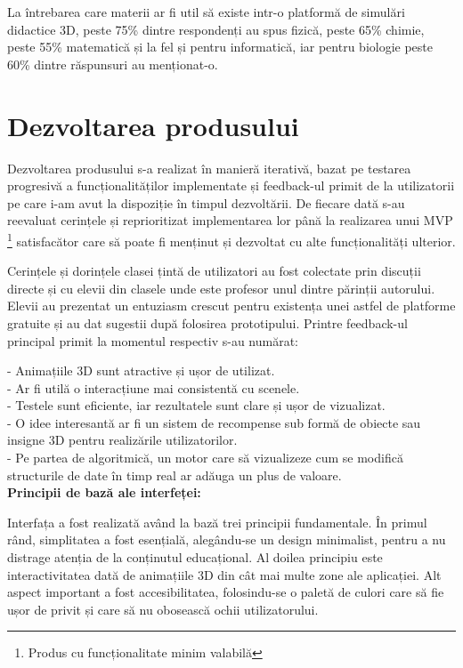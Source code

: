 La întrebarea care materii ar fi util să existe intr-o platformă de simulări didactice 3D,
peste 75\% dintre respondenți au spus fizică, peste 65\% chimie, peste 55\% matematică și la fel și pentru informatică, iar 
pentru biologie peste 60\% dintre răspunsuri au menționat-o.

\section{Dezvoltarea produsului}
\label{sec:proj-development}

Dezvoltarea produsului s-a realizat în manieră iterativă, bazat pe testarea progresivă a funcționalităților 
implementate și feedback-ul primit de la utilizatorii pe care i-am avut la dispoziție în timpul dezvoltării.
De fiecare dată s-au reevaluat cerințele și reprioritizat implementarea lor până la realizarea unui MVP
\footnote{Produs cu funcționalitate minim valabilă} satisfacător care să poate fi menținut și dezvoltat cu alte funcționalități ulterior. 

Cerințele și dorințele clasei țintă de utilizatori au fost colectate prin discuții directe și cu elevii din clasele
unde este profesor unul dintre părinții autorului. Elevii au prezentat un entuziasm crescut pentru existența unei
astfel de platforme gratuite și au dat sugestii după folosirea prototipului. Printre feedback-ul
principal primit la momentul respectiv s-au numărat:

- Animațiile 3D sunt atractive și ușor de utilizat.\\
- Ar fi utilă o interacțiune mai consistentă cu scenele.\\
- Testele sunt eficiente, iar rezultatele sunt clare și ușor de vizualizat.\\
- O idee interesantă ar fi un sistem de recompense sub formă de obiecte sau insigne 3D pentru realizările utilizatorilor.\\
- Pe partea de algoritmică, un motor care să vizualizeze cum se modifică structurile de date în timp real ar adăuga un plus de valoare.\\

\textbf{Principii de bază ale interfeței:}

Interfața a fost realizată având la bază trei principii fundamentale. În primul rând, simplitatea 
a fost esențială, alegându-se un design minimalist, pentru a nu distrage atenția de la 
conținutul educațional. Al doilea principiu este interactivitatea dată de animațiile 3D din cât mai multe zone ale aplicației.
Alt aspect important a fost accesibilitatea, folosindu-se o paletă
de culori care să fie ușor de privit și care să nu obosească ochii utilizatorului.

